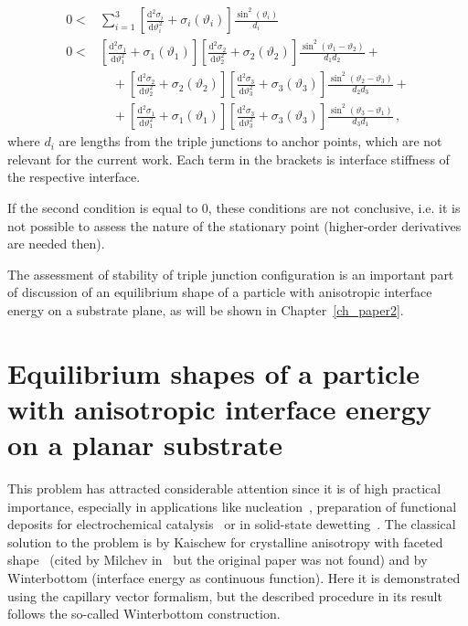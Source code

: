\begin{align} \label{eq_3jun_aniso_stabcond1}
    0 <& \sum_{i=1}^3 \left[ \frac{\mathrm{d}^2 \sigma_i}{\mathrm{d} \vartheta_i^2} + \sigma_i(\vartheta_i) \right]\frac{\sin^2(\vartheta_i)}{d_i} \\  \label{eq_3jun_aniso_stabcond2}
    0 <& \left[ \frac{\mathrm{d}^2 \sigma_1}{\mathrm{d} \vartheta_1^2} + \sigma_1(\vartheta_1) \right]\left[ \frac{\mathrm{d}^2 \sigma_2}{\mathrm{d} \vartheta_2^2} + \sigma_2(\vartheta_2) \right] \frac{\sin^2(\vartheta_1-\vartheta_2)}{d_1d_2} +    \\
     &\quad +\left[ \frac{\mathrm{d}^2 \sigma_2}{\mathrm{d} \vartheta_2^2} + \sigma_2(\vartheta_2) \right]\left[ \frac{\mathrm{d}^2 \sigma_3}{\mathrm{d} \vartheta_3^2} +  \sigma_3(\vartheta_3) \right] \frac{\sin^2(\vartheta_2-\vartheta_3)}{d_2d_3} + \nonumber \\
     &\quad + \left[ \frac{\mathrm{d}^2 \sigma_1}{\mathrm{d} \vartheta_1^2} + \sigma_1(\vartheta_1) \right]\left[ \frac{\mathrm{d}^2 \sigma_3}{\mathrm{d} \vartheta_3^2} + \sigma_3(\vartheta_3) \right]  \frac{\sin^2(\vartheta_3-\vartheta_1)}{d_3d_1} \nonumber \,,
\end{align}
where $d_i$ are lengths from the triple junctions to anchor points, which are not relevant for the current work. Each term in the brackets is interface stiffness of the respective interface.

If the second condition is equal to 0, these conditions are not conclusive, i.e. it is not possible to assess the nature of the stationary point (higher-order derivatives are needed then). 

The assessment of stability of triple junction configuration is an important part of discussion of an equilibrium shape of a particle with anisotropic interface energy on a substrate plane, as will be shown in Chapter~\ref{ch_paper2}.

\section{Equilibrium shapes of a particle with anisotropic interface energy on a planar substrate}
This problem has attracted considerable attention since it is of high practical importance, especially in applications like nucleation~\cite{Bormashenko2021}, preparation of functional deposits for electrochemical catalysis~\cite{Tian2007} or in solid-state dewetting~\cite{Thompson2012, PierreLuis2016, Bao2017}. The classical solution to the problem is by Kaischew for crystalline anisotropy with faceted shape~\cite{Kaischew1951} (cited by Milchev in~\cite{Milchev2002} but the original paper was not found) and by Winterbottom \cite{Winterbottom1967} (interface energy as continuous function). Here it is demonstrated using the capillary vector formalism, but the described procedure in its result follows the so-called Winterbottom construction. 

